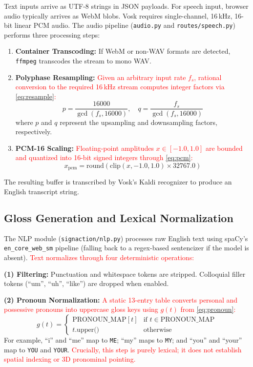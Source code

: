 \documentclass[conference,a4paper,10pt]{IEEEtran}
\begin{document}
Text inputs arrive as UTF-8 strings in JSON payloads. For speech input, browser audio typically arrives as WebM blobs. Vosk requires single-channel, 16\,kHz, 16-bit linear PCM audio. The audio pipeline (\texttt{audio.py} and \texttt{routes/speech.py}) performs three processing steps:
\begin{enumerate}
    \item \textbf{Container Transcoding:} If WebM or non-WAV formats are detected, \texttt{ffmpeg} transcodes the stream to mono WAV.
    \item \textbf{Polyphase Resampling:} \textcolor{red}{Given an arbitrary input rate $f_s$, rational conversion to the required 16\,kHz stream computes integer factors via \eqref{eq:resample}:}
    \begin{equation}
    p = \frac{16000}{\gcd(f_s, 16000)}, \quad q = \frac{f_s}{\gcd(f_s, 16000)}
    \label{eq:resample}
    \end{equation}
    where $p$ and $q$ represent the upsampling and downsampling factors, respectively.
    \item \textbf{PCM-16 Scaling:} \textcolor{red}{Floating-point amplitudes $x \in [-1.0, 1.0]$ are bounded and quantized into 16-bit signed integers through \eqref{eq:pcm}:}
    \begin{equation}
    x_{\text{pcm}} = \text{round}\left( \text{clip}(x, -1.0, 1.0) \times 32767.0 \right)
    \label{eq:pcm}
    \end{equation}
\end{enumerate}
The resulting buffer is transcribed by Vosk's Kaldi recognizer to produce an English transcript string.

\subsection{Gloss Generation and Lexical Normalization}
\label{subsec:nlp}

The NLP module (\texttt{signaction/nlp.py}) processes raw English text using spaCy's \texttt{en\_core\_web\_sm} pipeline (falling back to a regex-based sentencizer if the model is absent). \textcolor{red}{Text normalizes through four deterministic operations:}

\textbf{(1) Filtering:} Punctuation and whitespace tokens are stripped. Colloquial filler tokens (``um'', ``uh'', ``like'') are dropped when enabled.

\textbf{(2) Pronoun Normalization:} \textcolor{red}{A static 13-entry table converts personal and possessive pronouns into uppercase gloss keys using $g(t)$ from \eqref{eq:pronoun}:}
\begin{equation}
g(t) = 
\begin{cases}
\text{PRONOUN\_MAP}[t] & \text{if } t \in \text{PRONOUN\_MAP} \\
t.\text{upper()} & \text{otherwise}
\end{cases}
\label{eq:pronoun}
\end{equation}
For example, ``i'' and ``me'' map to \texttt{ME}; ``my'' maps to \texttt{MY}; and ``you'' and ``your'' map to \texttt{YOU} and \texttt{YOUR}. \textcolor{red}{Crucially, this step is purely lexical; it does not establish spatial indexing or 3D pronominal pointing.}
\end{document}
